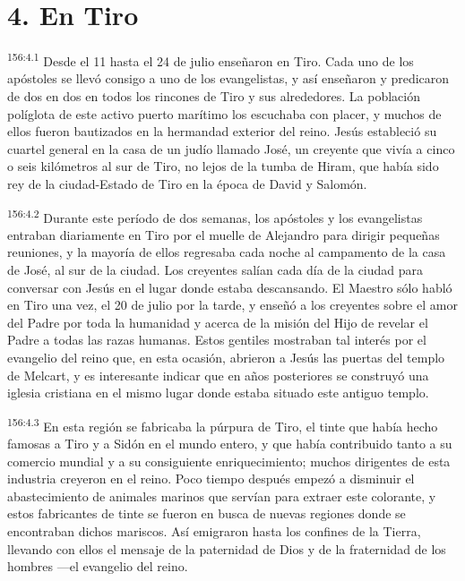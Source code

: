 \section*{4. En Tiro}
\par 
\textsuperscript{156:4.1} Desde el 11 hasta el 24 de julio enseñaron en Tiro. Cada uno de los apóstoles se llevó consigo a uno de los evangelistas, y así enseñaron y predicaron de dos en dos en todos los rincones de Tiro y sus alrededores. La población políglota de este activo puerto marítimo los escuchaba con placer, y muchos de ellos fueron bautizados en la hermandad exterior del reino. Jesús estableció su cuartel general en la casa de un judío llamado José, un creyente que vivía a cinco o seis kilómetros al sur de Tiro, no lejos de la tumba de Hiram, que había sido rey de la ciudad-Estado de Tiro en la época de David y Salomón.

\par 
\textsuperscript{156:4.2} Durante este período de dos semanas, los apóstoles y los evangelistas entraban diariamente en Tiro por el muelle de Alejandro para dirigir pequeñas reuniones, y la mayoría de ellos regresaba cada noche al campamento de la casa de José, al sur de la ciudad. Los creyentes salían cada día de la ciudad para conversar con Jesús en el lugar donde estaba descansando. El Maestro sólo habló en Tiro una vez, el 20 de julio por la tarde, y enseñó a los creyentes sobre el amor del Padre por toda la humanidad y acerca de la misión del Hijo de revelar el Padre a todas las razas humanas. Estos gentiles mostraban tal interés por el evangelio del reino que, en esta ocasión, abrieron a Jesús las puertas del templo de Melcart, y es interesante indicar que en años posteriores se construyó una iglesia cristiana en el mismo lugar donde estaba situado este antiguo templo.

\par 
\textsuperscript{156:4.3} En esta región se fabricaba la púrpura de Tiro, el tinte que había hecho famosas a Tiro y a Sidón en el mundo entero, y que había contribuido tanto a su comercio mundial y a su consiguiente enriquecimiento; muchos dirigentes de esta industria creyeron en el reino. Poco tiempo después empezó a disminuir el abastecimiento de animales marinos que servían para extraer este colorante, y estos fabricantes de tinte se fueron en busca de nuevas regiones donde se encontraban dichos mariscos. Así emigraron hasta los confines de la Tierra, llevando con ellos el mensaje de la paternidad de Dios y de la fraternidad de los hombres ---el evangelio del reino.

